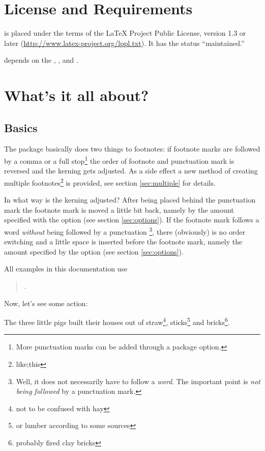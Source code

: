 \documentclass[toc=index,toc=bib]{cnpkgdoc}
\newcommand\setapart[1]{%
  \begin{quote}
   #1
  \end{quote}}
\begin{document}
\section{License and Requirements}
\fnpct is placed under the terms of the LaTeX Project Public License,
version 1.3 or later (\url{http://www.latex-project.org/lppl.txt}).
It has the status ``maintained.''

\fnpct depends on the , ,  and
.

\section{What's it all about?}
\subsection{Basics}
The \fnpct package basically does two things to footnotes: if footnote marks are
followed by a comma or a full stop\footnote{More punctuation marks can be added
through a package option.} the order of footnote and punctuation mark is
reversed and the kerning gets adjusted. As a side effect a new method of creating
multiple footnotes\footnote{like;this} is provided, see section \ref{sec:multiple}
for details.

In what way is the kerning adjusted? After being placed behind the punctuation
mark the footnote mark is moved a little bit back, namely by the amount specified
with the option  (see section \ref{sec:options}). If the
footnote mark follows a word \emph{without} being followed by a punctuation%
\footnote{Well, it does not necessarily have to follow a \emph{word}. The important
point is \emph{not being followed} by a punctuation mark.}, there (obviously) is
no order switching and a little space is inserted before the footnote mark, namely
the amount specified by the option  (see section
\ref{sec:options}).

All examples in this documentation use

\setapart{\cmd{thempfootnote}{\cmd{arabic}{mpfootnote}}.}

Now, let's see some action:
\begin{beispiel}
 \begin{minipage}{.4\linewidth}
  \noindent The three little pigs built their houses
  out of straw\footnote{not to be confused with hay},
  sticks\footnote{or lumber according to some sources}
  and bricks\footnote{probably fired clay bricks}.
 \end{minipage}
\end{beispiel}
\end{document}
